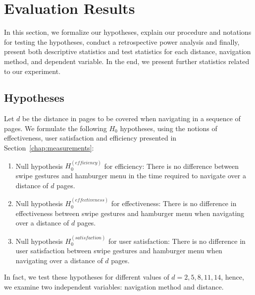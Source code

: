 \documentclass{sig-alternate-05-2015}
\begin{document}
\section{Evaluation Results}
In this section, we formalize our hypotheses, explain our procedure and notations for testing the hypotheses, conduct a retrospective power analysis and finally, present both descriptive statistics
and test statistics for each distance, navigation method, and dependent variable. In the end, we present further statistics related to our experiment.

\subsection{Hypotheses}
Let $d$ be the distance in pages to be covered when navigating in a sequence of pages. We formulate the following $H_0$ hypotheses, using the notions
of effectiveness, user satisfaction and efficiency presented in Section~\ref{chap:measurements}:
\begin{enumerate}
	\item Null hypothesis $H_0^{(efficiency)}$ for efficiency:
	There is no difference between swipe gestures and hamburger menu in the
	time required to navigate over a distance of $d$ pages.
	\item Null hypothesis $H_0^{(effectiveness)}$ for effectiveness: There is no
	difference in effectiveness between swipe gestures and hamburger menu
	when navigating over a distance of $d$ pages.
	\item Null hypothesis $H_0^{(satisfaction)}$ for user satisfaction: There is no
	difference in user satisfaction between swipe gestures and hamburger menu
	when navigating over a distance of $d$ pages.
\end{enumerate}

In fact, we test these hypotheses for different values of $d = 2, 5, 8, 11, 14$, hence, we
examine two independent variables: navigation method and distance.

\end{document}
